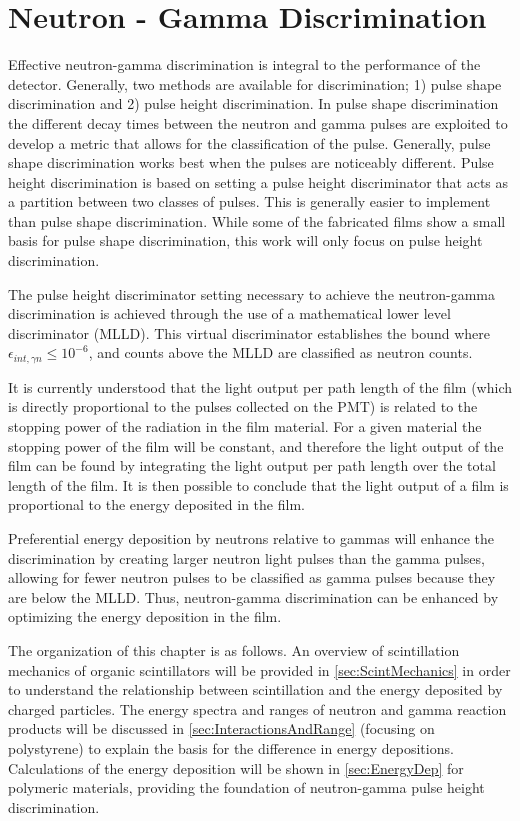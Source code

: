 \chapter{Neutron - Gamma Discrimination}
\label{chap:SecElectron}

Effective neutron-gamma discrimination is integral to the performance of the detector.
Generally, two methods are available for discrimination; 1) pulse shape discrimination and 2) pulse height discrimination.
In pulse shape discrimination the different decay times between the neutron and gamma pulses are exploited to develop a metric that allows for the classification of the pulse.
Generally, pulse shape discrimination works best when the pulses are noticeably different.
Pulse height discrimination is based on setting a pulse height discriminator that acts as a partition between two classes of pulses.
This is generally easier to implement than pulse shape discrimination.
While some of the fabricated films show a small basis for pulse shape discrimination, this work will only focus on pulse height discrimination.

The pulse height discriminator setting necessary to achieve the neutron-gamma discrimination is achieved through the use of a mathematical lower level discriminator (MLLD).
This virtual discriminator establishes the bound where $\epsilon_{int,\gamma n}\leq 10^{-6}$, and counts above the MLLD are classified as neutron counts. 

It is currently understood that the light output per path length of the film (which is directly proportional to the pulses collected on the PMT) is related to the stopping power of the radiation in the film material.
For a given material the stopping power of the film will be constant, and therefore the light output of the film can be found by integrating the light output per path length over the total length of the film.
It is then possible to conclude that the light output of a film is proportional to the energy deposited in the film.

Preferential energy deposition by neutrons relative to gammas will enhance the discrimination by creating larger neutron light pulses than the gamma pulses, allowing for fewer neutron pulses to be classified as gamma pulses because they are below the MLLD.
Thus, neutron-gamma discrimination can be enhanced by optimizing the energy deposition in the film. 

The organization of this chapter is as follows.
An overview of scintillation mechanics of organic scintillators will be provided in \autoref{sec:ScintMechanics} in order to understand the relationship between scintillation and the energy deposited by charged particles.
The energy spectra and ranges of neutron and gamma reaction products will be discussed in \autoref{sec:InteractionsAndRange} (focusing on polystyrene) to explain the basis for the difference in energy depositions. 
Calculations of the energy deposition will be shown in \autoref{sec:EnergyDep} for polymeric materials, providing the foundation of neutron-gamma pulse height discrimination.


